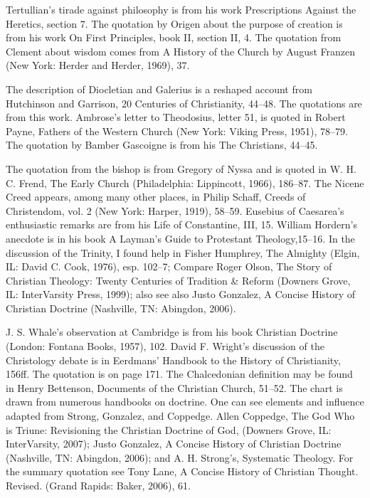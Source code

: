 \begin{notelist}
\entry Tertullian’s tirade against philosophy is from his work Prescriptions Against the Heretics,
  section 7. The quotation by Origen about the purpose of creation is from his work On First
  Principles, book II, section II, 4.
\entry The quotation from Clement about wisdom comes from A History of the Church by August Franzen
  (New York: Herder and Herder, 1969), 37.
\end{notelist}

\begin{notelist}
\entry The description of Diocletian and Galerius is a reshaped account from Hutchinson and
  Garrison, 20 Centuries of Christianity, 44–48. The quotations are from this work.
\entry Ambrose’s letter to Theodosius, letter 51, is quoted in Robert Payne, Fathers of the Western
  Church (New York: Viking Press, 1951), 78–79.
\entry The quotation by Bamber Gascoigne is from his The Christians, 44–45.
\end{notelist}

\begin{notelist}
\entry The quotation from the bishop is from Gregory of Nyssa and is quoted in W. H. C. Frend, The
  Early Church (Philadelphia: Lippincott, 1966), 186–87.
\entry The Nicene Creed appears, among many other places, in Philip Schaff, Creeds of Christendom,
  vol. 2 (New York: Harper, 1919), 58–59.
\entry Eusebius of Caesarea’s enthusiastic remarks are from his Life of Constantine, III, 15.
\entry William Hordern’s anecdote is in his book A Layman’s Guide to Protestant Theology,15–16.
\entry In the discussion of the Trinity, I found help in Fisher Humphrey, The Almighty (Elgin, IL:
  David C. Cook, 1976), esp. 102–7; Compare Roger Olson, The Story of Christian Theology: Twenty
  Centuries of Tradition \& Reform (Downers Grove, IL: InterVarsity Press, 1999); also see also
  Justo Gonzalez, A Concise History of Christian Doctrine (Nashville, TN: Abingdon, 2006).
\end{notelist}

\begin{notelist}
\entry J. S. Whale’s observation at Cambridge is from his book Christian Doctrine (London: Fontana
  Books, 1957), 102.
\entry David F. Wright’s discussion of the Christology debate is in Eerdmans’ Handbook to the
  History of Christianity, 156ff. The quotation is on page 171.
\entry The Chalcedonian definition may be found in Henry Bettenson, Documents of the Christian
  Church, 51–52.
\entry The chart is drawn from numerous handbooks on doctrine. One can see elements and influence
  adapted from Strong, Gonzalez, and Coppedge. Allen Coppedge, The God Who is Triune: Revisioning
  the Christian Doctrine of God, (Downers Grove, IL: InterVarsity, 2007); Justo Gonzalez, A Concise
  History of Christian Doctrine (Nashville, TN: Abingdon, 2006); and A. H. Strong’s, Systematic
  Theology. For the summary quotation see Tony Lane, A Concise History of Christian Thought.
  Revised. (Grand Rapids: Baker, 2006), 61.
\end{notelist}

